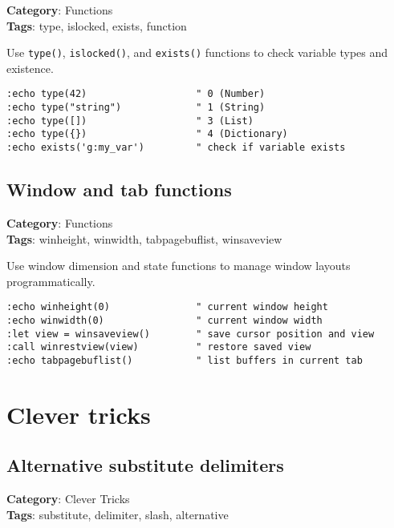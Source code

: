 {\textbf{Category}: Functions\\ \textbf{Tags}: type, islocked, exists, function
\vspace{0.5cm}

Use {\footnotesize \Verb§type()§}, {\footnotesize \Verb§islocked()§}, and {\footnotesize \Verb§exists()§} functions to check variable types and existence.

\begin{Exa*}{}
\begin{Verbatim}[fontsize=\footnotesize, breaklines, breakanywhere]
:echo type(42)                   " 0 (Number)
:echo type("string")             " 1 (String)  
:echo type([])                   " 3 (List)
:echo type({})                   " 4 (Dictionary)
:echo exists('g:my_var')         " check if variable exists
\end{Verbatim}
\end{Exa*}

\section{Window and tab functions}

\textbf{Category}: Functions\\ \textbf{Tags}: winheight, winwidth, tabpagebuflist, winsaveview
\vspace{0.5cm}

Use window dimension and state functions to manage window layouts programmatically.

\begin{Exa*}{}
\begin{Verbatim}[fontsize=\footnotesize, breaklines, breakanywhere]
:echo winheight(0)               " current window height
:echo winwidth(0)                " current window width  
:let view = winsaveview()        " save cursor position and view
:call winrestview(view)          " restore saved view
:echo tabpagebuflist()           " list buffers in current tab
\end{Verbatim}
\end{Exa*}

\chapter{Clever tricks}
\section{Alternative substitute delimiters}

\textbf{Category}: Clever Tricks\\ \textbf{Tags}: substitute, delimiter, slash, alternative
\vspace{0.5cm}

}
